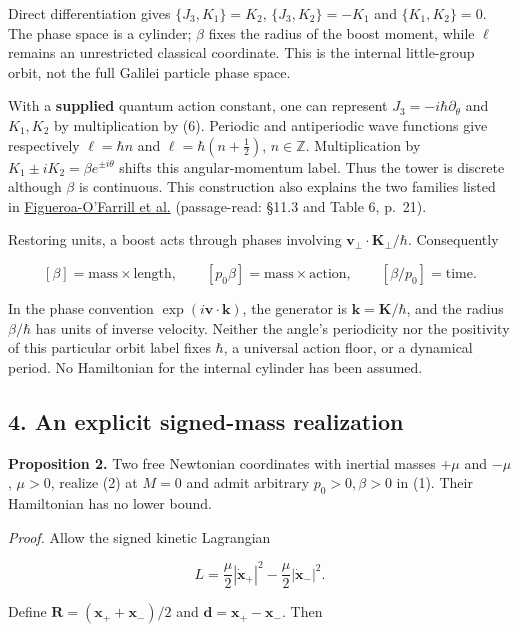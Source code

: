 \documentclass[11pt,a4paper]{article}
\begin{document}
Direct differentiation gives \(\{J_3,K_1\}=K_2\), \(\{J_3,K_2\}=-K_1\)
and \(\{K_1,K_2\}=0\). The phase space is a cylinder; \(\beta\) fixes
the radius of the boost moment, while \(\ell\) remains an unrestricted
classical coordinate. This is the internal little-group orbit, not the
full Galilei particle phase space.

With a \textbf{supplied} quantum action constant, one can represent
\(J_3=-i\hbar\partial_\theta\) and \(K_1,K_2\) by multiplication by (6).
Periodic and antiperiodic wave functions give respectively
\(\ell=\hbar n\) and \(\ell=\hbar(n+\tfrac12)\), \(n\in\mathbb Z\).
Multiplication by \(K_1\pm iK_2=\beta e^{\pm i\theta}\) shifts this
angular-momentum label. Thus the tower is discrete although \(\beta\) is
continuous. This construction also explains the two families listed in
\href{https://arxiv.org/pdf/2401.03241v1}{Figueroa-O'Farrill et al.}
(passage-read: §11.3 and Table 6, p.~21).

Restoring units, a boost acts through phases involving
\(\mathbf v_\perp\cdot\mathbf K_\perp/\hbar\). Consequently

\[
[\beta]=\text{mass}\times\text{length},\qquad
[p_0\beta]=\text{mass}\times\text{action},\qquad
[\beta/p_0]=\text{time}. \tag{7}
\]

In the phase convention \(\exp(i\mathbf v\cdot\mathbf k)\), the
generator is \(\mathbf k=\mathbf K/\hbar\), and the radius
\(\beta/\hbar\) has units of inverse velocity. Neither the angle's
periodicity nor the positivity of this particular orbit label fixes
\(\hbar\), a universal action floor, or a dynamical period. No
Hamiltonian for the internal cylinder has been assumed.

\hypertarget{an-explicit-signed-mass-realization}{%
\subsection{4. An explicit signed-mass
realization}\label{an-explicit-signed-mass-realization}}

\textbf{Proposition 2.} Two free Newtonian coordinates with inertial
masses \(+\mu\) and \(-\mu\), \(\mu>0\), realize (2) at \(M=0\) and
admit arbitrary \(p_0>0,\beta>0\) in (1). Their Hamiltonian has no lower
bound.

\emph{Proof.} Allow the signed kinetic Lagrangian

\[
L=\frac\mu2|\dot{\mathbf x}_+|^2
-\frac\mu2|\dot{\mathbf x}_-|^2.
\]

Define \(\mathbf R=(\mathbf x_++\mathbf x_-)/2\) and
\(\mathbf d=\mathbf x_+-\mathbf x_-\). Then
\end{document}
